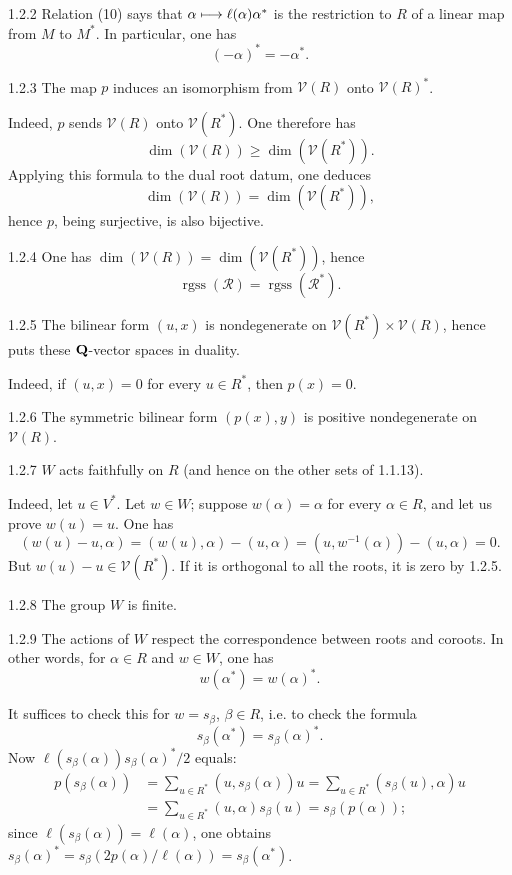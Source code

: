 \begin{scholium}{1.2.2}\label{XXI.1.2.2}
Relation (10) says that $\alpha\longmapsto\ell(\alpha)\alpha^*$ is the restriction to $R$ of a linear map from $M$ to $M^*$. In particular, one has
\[
(-\alpha)^*=-\alpha^*.
\]
\end{scholium}
\begin{corollary}{1.2.3}\label{XXI.1.2.3}
The map $p$ induces an isomorphism from $\mathcal V(R)$ onto $\mathcal V(R)^*$.
\end{corollary}
Indeed, $p$ sends $\mathcal V(R)$ onto $\mathcal V(R^*)$. One therefore has
\[
\dim(\mathcal V(R))\geq\dim(\mathcal V(R^*)).
\]
Applying this formula to the dual root datum, one deduces
\[
\dim(\mathcal V(R))=\dim(\mathcal V(R^*)),
\]
hence $p$, being surjective, is also bijective.

\begin{corollary}{1.2.4}\label{XXI.1.2.4}
One has $\dim(\mathcal V(R))=\dim(\mathcal V(R^*))$, hence
\[
\operatorname{rgss}(\mathcal R)=\operatorname{rgss}(\mathcal R^*).
\]
\end{corollary}
\begin{corollary}{1.2.5}\label{XXI.1.2.5}
The bilinear form $(u,x)$ is nondegenerate on $\mathcal V(R^*)\times\mathcal V(R)$, hence puts these $\mathbf{Q}$-vector spaces in duality.
\end{corollary}
Indeed, if $(u,x)=0$ for every $u\in R^*$, then $p(x)=0$.
\begin{corollary}{1.2.6}\label{XXI.1.2.6}
The symmetric bilinear form $(p(x),y)$ is positive nondegenerate on $\mathcal V(R)$.
\end{corollary}
\begin{corollary}{1.2.7}\label{XXI.1.2.7}
$W$ acts faithfully on $R$ (and hence on the other sets of 1.1.13).
\end{corollary}
Indeed, let $u\in V^*$. Let $w\in W$; suppose $w(\alpha)=\alpha$ for every $\alpha\in R$, and let us prove $w(u)=u$. One has
\[
(w(u)-u,\alpha)=(w(u),\alpha)-(u,\alpha)=(u,w^{-1}(\alpha))-(u,\alpha)=0.
\]
But $w(u)-u\in\mathcal V(R^*)$. If it is orthogonal to all the roots, it is zero by 1.2.5.
\begin{corollary}{1.2.8}\label{XXI.1.2.8}
The group $W$ is finite.
\end{corollary}

\begin{proposition}{1.2.9}\label{XXI.1.2.9}
The actions of $W$ respect the correspondence between roots and coroots. In other words, for $\alpha\in R$ and $w\in W$, one has
\[
w(\alpha^*)=w(\alpha)^*.
\]
\end{proposition}
It suffices to check this for $w=s_\beta$, $\beta\in R$, i.e. to check the formula
\[
s_\beta(\alpha^*)=s_\beta(\alpha)^*.
\]
Now $\ell(s_\beta(\alpha))s_\beta(\alpha)^*/2$ equals:
\[
\begin{aligned}
p(s_\beta(\alpha))&=\sum_{u\in R^*}(u,s_\beta(\alpha))u=\sum_{u\in R^*}(s_\beta(u),\alpha)u\\
&=\sum_{u\in R^*}(u,\alpha)s_\beta(u)=s_\beta(p(\alpha));
\end{aligned}
\]
since $\ell(s_\beta(\alpha))=\ell(\alpha)$, one obtains $s_\beta(\alpha)^*=s_\beta(2p(\alpha)/\ell(\alpha))=s_\beta(\alpha^*)$.

